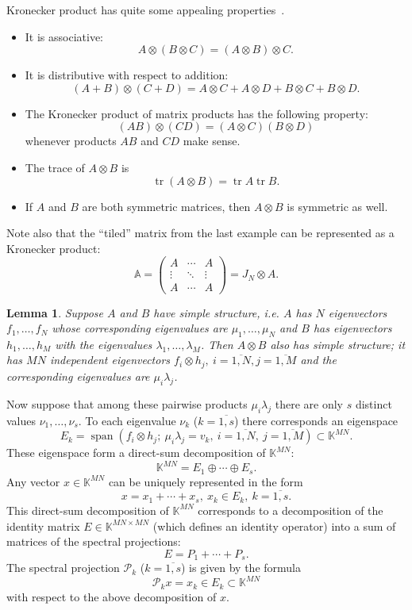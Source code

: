 \documentclass[a4paper]{jpconf}
\newtheorem{nkjpcslem}{Lemma}
\begin{document}
Kronecker product has quite some appealing properties~\cite{bellman-matrices-kron}.
\begin{itemize}
\item It is associative:
    \[ A\otimes (B\otimes C) = (A\otimes B)\otimes C. \]
\item It is distributive with respect to addition:
    \[ (A+B)\otimes(C+D) = A\otimes C + A\otimes D + B\otimes C + B\otimes D. \]
\item The Kronecker product of matrix products has the following property:
    \[ (AB)\otimes(CD) = (A\otimes C)(B\otimes D) \]
    whenever products \( AB \) and \( CD \) make sense.
\item The trace of \( A\otimes B \) is \[ \operatorname{tr}(A\otimes B) = \operatorname{tr}A\operatorname{tr}B. \]
\item If \( A \) and \( B \) are both symmetric matrices,
      then \( A\otimes B \) is symmetric as well.
\end{itemize}
Note also that the ``tiled'' matrix from the last example
    can be represented as a Kronecker product:
\[
    \mathbb{A} =
    \begin{pmatrix}
    A & \cdots & A\\
    \vdots & \ddots & \vdots \\
    A & \cdots & A\end{pmatrix} =
        J_N\otimes A.
    \]

\begin{nkjpcslem}
Suppose \( A \) and \( B \) have simple structure,
    i.e. \( A \) has \( N \) eigenvectors
    \( f_1, \ldots, f_N \)
    whose corresponding eigenvalues are \( \mu_1, \ldots, \mu_N \)
    and \( B \) has eigenvectors \( h_1, \ldots, h_M \)
    with the eigenvalues \( \lambda_1, \ldots, \lambda_M \).
Then \( A\otimes B \) also has simple structure;
    it has \( MN \) independent eigenvectors \( f_i\otimes h_j,\ i{=}\overline{1,N}, j{=}\overline{1,M} \)
    and the corresponding eigenvalues are \( \mu_i \lambda_j \).
\end{nkjpcslem}


Now suppose that among these pairwise products \( \mu_i \lambda_j \)
    there are only \( s \) distinct values \( \nu_1, \ldots, \nu_s \).
To each eigenvalue \( \nu_k \) (\( k{=}\overline{1,s} \)) there corresponds
    an eigenspace \[ E_k = \operatorname{span}(f_i\otimes h_j;\ \mu_i\lambda_j = v_k,\ i{=}\overline{1,N},\ j{=}\overline{1,M}) \subset \mathbb{K}^{MN}. \]
These eigenspace form a direct-sum decomposition of \( \mathbb{K}^{MN} \):
    \[ \mathbb{K}^{MN} = E_1 \oplus \cdots \oplus E_s. \]
Any vector \( x\in\mathbb{K}^{MN} \) can be uniquely represented
    in the form
    \[
        x = x_1 + \cdots + x_s,\ x_k\in E_k,\ k=\overline{1,s}.
    \]
This direct-sum decomposition of \( \mathbb{K}^{MN} \)
    corresponds to a decomposition of the identity matrix \( E\in \mathbb{K}^{MN{\times}MN} \)
    (which defines an identity operator)
    into a sum of matrices of the spectral projections:
    \[
        E = P_1 + \cdots + P_s.
    \]
The spectral projection \( \mathcal{P}_k \) (\(k{=}\overline{1,s}\)) is given by the formula
    \[
        \mathcal{P}_k x = x_k \in E_k\subset \mathbb{K}^{MN}
    \]
    with respect to the above decomposition of \( x \).
\end{document}
